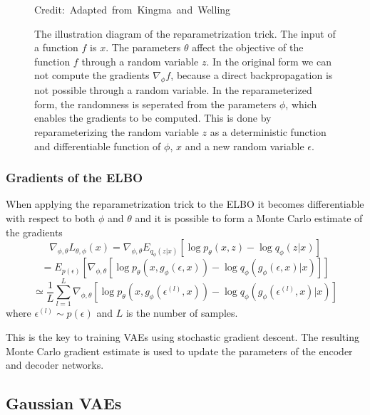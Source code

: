\begin{figure}
    \caption[The illustration diagram of the reparametrization trick]%
    {The illustration diagram of the reparametrization trick. The input of a function $f$ is $x$. The parameters $\theta$ affect the objective of the function $f$ through a random variable $z$. In the original form we can not compute the gradients $\nabla_{\phi} f$, because a direct backpropagation is not possible through a random variable. In the reparameterized form, the randomness is seperated from the parameters $\phi$, which enables the gradients to be computed. This is done by reparameterizing the random variable $z$ as a deterministic function and differentiable function  of $\phi$, $x$ and a new random variable $\epsilon$.\cite{Kingma_2019}}

    \hspace*{15pt}\hbox{\scriptsize Credit: Adapted from Kingma and Welling\cite{Kingma_2019}  }\label{reparametrization}

\end{figure}

\subsubsection{Gradients of the ELBO}

When applying the reparametrization trick to the ELBO it becomes differentiable with respect to both $\phi$ and $\theta$ and it is possible to form a Monte Carlo estimate of the gradients
\[ \nabla_{\phi, \theta} L_{\theta, \phi}(x) = \nabla_{\phi, \theta} E_{q_{\phi}(z|x)} [\log p_{\theta}(x, z) - \log q_{\phi}(z|x)] \]
\[ = E_{p(\epsilon)}[\nabla_{\phi, \theta} [\log p_{\theta}(x, g_{\phi}(\epsilon, x)) - \log q_{\phi}(g_{\phi}(\epsilon, x)|x)]] \]
\[  \simeq \frac{1}{L} \sum_{l=1}^{L} \nabla_{\phi, \theta} [\log p_{\theta}(x, g_{\phi}(\epsilon^{(l)}, x)) - \log q_{\phi}(g_{\phi}(\epsilon^{(l)}, x)|x)] \]
where $\epsilon^{(l)} \sim p(\epsilon)$ and $L$ is the number of samples.

This is the key to training VAEs using stochastic gradient descent. The resulting Monte Carlo gradient estimate is used to update the parameters of the encoder and decoder networks.\cite{Kingma_2019}


\subsection{Gaussian VAEs}

